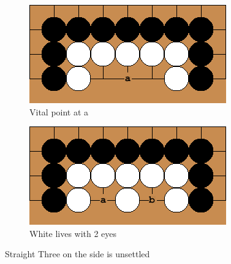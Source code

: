 \documentclass{l4proj}
\begin{document}
\begin{figure}[!ht]
\centering
\begin{subfigure}[b]{0.4\textwidth}
\includegraphics[width=\textwidth]{LD/3a.png}
\caption{Vital point at a}
\label{fig:LD-3a}
\end{subfigure}\qquad
\begin{subfigure}[b]{0.4\textwidth}
\includegraphics[width=\textwidth]{LD/3b.png}
\caption{White lives with 2 eyes}
\label{fig:LD-3b}
\end{subfigure}
\caption{Straight Three on the side is unsettled}
\label{fig:LD-3}
\end{figure}
\end{document}
